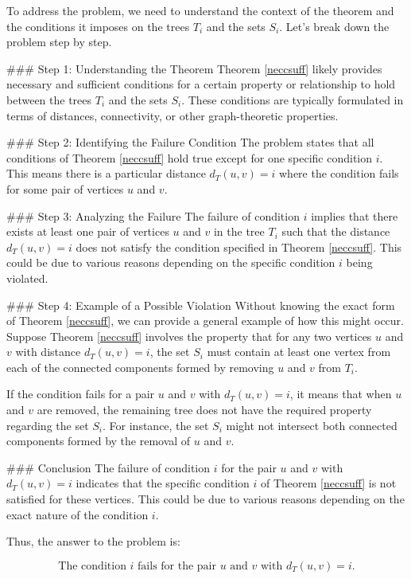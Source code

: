 To address the problem, we need to understand the context of the theorem and the conditions it imposes on the trees \( T_i \) and the sets \( S_i \). Let's break down the problem step by step.

### Step 1: Understanding the Theorem
Theorem \ref{neccsuff} likely provides necessary and sufficient conditions for a certain property or relationship to hold between the trees \( T_i \) and the sets \( S_i \). These conditions are typically formulated in terms of distances, connectivity, or other graph-theoretic properties.

### Step 2: Identifying the Failure Condition
The problem states that all conditions of Theorem \ref{neccsuff} hold true except for one specific condition \( i \). This means there is a particular distance \( d_T(u,v) = i \) where the condition fails for some pair of vertices \( u \) and \( v \).

### Step 3: Analyzing the Failure
The failure of condition \( i \) implies that there exists at least one pair of vertices \( u \) and \( v \) in the tree \( T_i \) such that the distance \( d_T(u,v) = i \) does not satisfy the condition specified in Theorem \ref{neccsuff}. This could be due to various reasons depending on the specific condition \( i \) being violated.

### Step 4: Example of a Possible Violation
Without knowing the exact form of Theorem \ref{neccsuff}, we can provide a general example of how this might occur. Suppose Theorem \ref{neccsuff} involves the property that for any two vertices \( u \) and \( v \) with distance \( d_T(u,v) = i \), the set \( S_i \) must contain at least one vertex from each of the connected components formed by removing \( u \) and \( v \) from \( T_i \).

If the condition fails for a pair \( u \) and \( v \) with \( d_T(u,v) = i \), it means that when \( u \) and \( v \) are removed, the remaining tree does not have the required property regarding the set \( S_i \). For instance, the set \( S_i \) might not intersect both connected components formed by the removal of \( u \) and \( v \).

### Conclusion
The failure of condition \( i \) for the pair \( u \) and \( v \) with \( d_T(u,v) = i \) indicates that the specific condition \( i \) of Theorem \ref{neccsuff} is not satisfied for these vertices. This could be due to various reasons depending on the exact nature of the condition \( i \).

Thus, the answer to the problem is:

\[
\boxed{\text{The condition } i \text{ fails for the pair } u \text{ and } v \text{ with } d_T(u,v) = i.}
\]